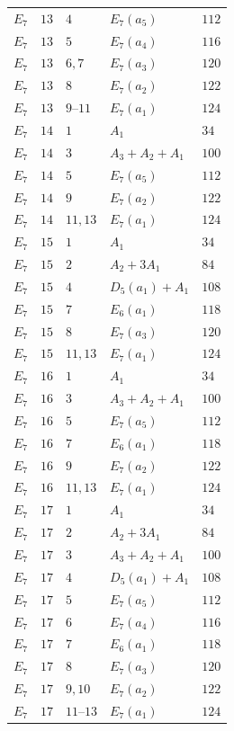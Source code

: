 \documentclass[11pt,a4paper]{amsart}
\numberwithin{equation}{section}
\theoremstyle{definition}
\theoremstyle{remark}
\begin{document}
{\begin{longtable}{@{}p{}p{}p{}p{}p{}@{}}
$E_{7}$&$13$&$4$&$E_{7}(a_{5})$&$112$\\
$E_{7}$&$13$&$5$&$E_{7}(a_{4})$&$116$\\
$E_{7}$&$13$&$6,7$&$E_{7}(a_{3})$&$120$\\
$E_{7}$&$13$&$8$&$E_{7}(a_{2})$&$122$\\
$E_{7}$&$13$&$9\text{--}11$&$E_{7}(a_{1})$&$124$\\
$E_{7}$&$14$&$1$&$A_{1}$&$34$\\
$E_{7}$&$14$&$3$&$A_{3}+A_{2}+A_{1}$&$100$\\
$E_{7}$&$14$&$5$&$E_{7}(a_{5})$&$112$\\
$E_{7}$&$14$&$9$&$E_{7}(a_{2})$&$122$\\
$E_{7}$&$14$&$11,13$&$E_{7}(a_{1})$&$124$\\
$E_{7}$&$15$&$1$&$A_{1}$&$34$\\
$E_{7}$&$15$&$2$&$A_{2}+3A_{1}$&$84$\\
$E_{7}$&$15$&$4$&$D_{5}(a_{1})+A_{1}$&$108$\\
$E_{7}$&$15$&$7$&$E_{6}(a_{1})$&$118$\\
$E_{7}$&$15$&$8$&$E_{7}(a_{3})$&$120$\\
$E_{7}$&$15$&$11,13$&$E_{7}(a_{1})$&$124$\\
$E_{7}$&$16$&$1$&$A_{1}$&$34$\\
$E_{7}$&$16$&$3$&$A_{3}+A_{2}+A_{1}$&$100$\\
$E_{7}$&$16$&$5$&$E_{7}(a_{5})$&$112$\\
$E_{7}$&$16$&$7$&$E_{6}(a_{1})$&$118$\\
$E_{7}$&$16$&$9$&$E_{7}(a_{2})$&$122$\\
$E_{7}$&$16$&$11,13$&$E_{7}(a_{1})$&$124$\\
$E_{7}$&$17$&$1$&$A_{1}$&$34$\\
$E_{7}$&$17$&$2$&$A_{2}+3A_{1}$&$84$\\
$E_{7}$&$17$&$3$&$A_{3}+A_{2}+A_{1}$&$100$\\
$E_{7}$&$17$&$4$&$D_{5}(a_{1})+A_{1}$&$108$\\
$E_{7}$&$17$&$5$&$E_{7}(a_{5})$&$112$\\
$E_{7}$&$17$&$6$&$E_{7}(a_{4})$&$116$\\
$E_{7}$&$17$&$7$&$E_{6}(a_{1})$&$118$\\
$E_{7}$&$17$&$8$&$E_{7}(a_{3})$&$120$\\
$E_{7}$&$17$&$9,10$&$E_{7}(a_{2})$&$122$\\
$E_{7}$&$17$&$11\text{--}13$&$E_{7}(a_{1})$&$124$\\
\end{longtable}
}
\end{document}
